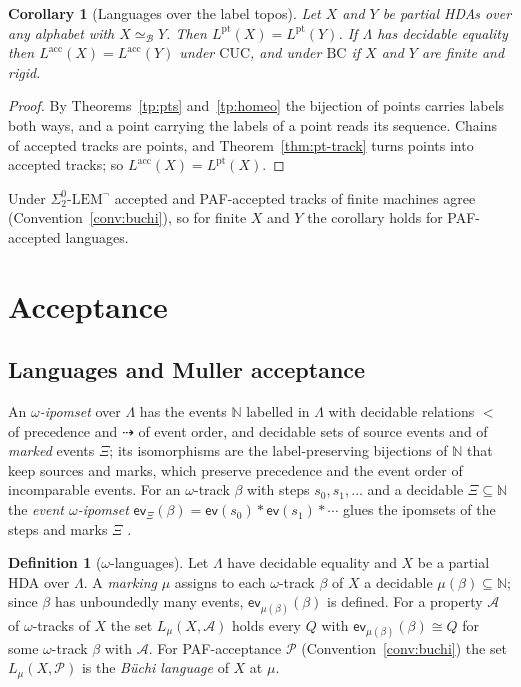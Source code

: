 \documentclass{lmcs}
\newtheorem{corollary}[theorem]{Corollary}
\theoremstyle{definition}
\newtheorem{definition}[theorem]{Definition}
\theoremstyle{remark}
\newcommand{\Nn}{\mathbb{N}}
\newcommand{\ip}{\mathsf{ev}}
\newcommand{\prin}[1]{\mathrm{#1}}
\newcommand{\EIO}{\Sigma^0_2\text{-}\prin{LEM}^{\neg}}
\providecommand{\evo}[2]{\mathsf{ev}_{#1}(#2)}
\providecommand{\LangA}[1]{L^{\mathrm{acc}}(#1)}
\providecommand{\LangPt}[1]{L^{\mathrm{pt}}(#1)}
\providecommand{\CUC}{\prin{CUC}}
\providecommand{\BC}{\prin{BC}}
\providecommand{\eqB}{\simeq_{\mathcal{B}}}
\providecommand{\CUC}{\prin{CUC}}
\providecommand{\BC}{\prin{BC}}
\begin{document}
\begin{corollary}[Languages over the label topos]\label{thm:mb-lang}
Let $X$ and $Y$ be partial HDAs over any alphabet with $X\eqB Y$. Then $\LangPt{X}=\LangPt{Y}$.
If $\Lambda$ has decidable equality then $\LangA{X}=\LangA{Y}$ under $\CUC$, and
under $\BC$ if $X$ and $Y$ are finite and rigid.
\end{corollary}

\begin{proof}
By Theorems~\ref{tp:pts} and~\ref{tp:homeo} the bijection of points carries labels both ways, and a point carrying
the labels of a point reads its sequence. Chains of
accepted tracks are points, and Theorem~\ref{thm:pt-track} turns points into accepted tracks; so
$\LangA{X}=\LangPt{X}$.
\end{proof}

Under $\EIO$ accepted and PAF-accepted tracks of finite
machines agree (Convention~\ref{conv:buchi}), so for finite $X$ and $Y$ the corollary holds for PAF-accepted languages.

\section{Acceptance}\label{sec:muller}

\subsection{Languages and Muller acceptance}\label{ssec:muller-defs}

An \emph{$\omega$-ipomset} over $\Lambda$ has the events $\Nn$ labelled in $\Lambda$ with decidable relations $<$ of
precedence and $\dashrightarrow$ of event order, and decidable sets of source events and of \emph{marked} events
$\Xi$; its isomorphisms are the label-preserving bijections of $\Nn$ that keep sources and
marks, which preserve precedence and the event order of incomparable events. For
an $\omega$-track $\beta$ with steps $s_0,s_1,\dots$ and a decidable $\Xi\subseteq\Nn$ the \emph{event
$\omega$-ipomset} $\evo{\Xi}{\beta}=\ip(s_0)*\ip(s_1)*\cdots$ glues the ipomsets of the steps and marks $\Xi$
\cite{PAF25}.

\begin{definition}[$\omega$-languages]\label{def:muller-lang}
Let $\Lambda$ have decidable equality and $X$ be a partial HDA over $\Lambda$. A \emph{marking} $\mu$ assigns to
each $\omega$-track $\beta$ of $X$ a decidable $\mu(\beta)\subseteq\Nn$; since $\beta$ has unboundedly many
events, $\evo{\mu(\beta)}{\beta}$ is defined. For a property $\mathcal{A}$ of $\omega$-tracks of $X$ the set
$L_\mu(X,\mathcal{A})$ holds every $Q$ with $\evo{\mu(\beta)}{\beta}\cong Q$ for some $\omega$-track $\beta$ with
$\mathcal{A}$. For PAF-acceptance $\mathcal{P}$ (Convention~\ref{conv:buchi}) the set
$L_\mu(X,\mathcal{P})$ is the \emph{B\"uchi language} of $X$ at $\mu$.
\end{definition}
\end{document}
